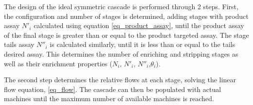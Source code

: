 The design of the ideal symmetric cascade is performed through 2 steps. First,
the configuration and number of stages is determined, adding stages with product assay $N'_i$ calculated using equation \ref{eq_product_assay}, until the
product assay of the final stage is greater than or equal to the product targeted assay. The stage tails assay $N''_i$ is calculated similarly, until it is less than or equal to the tails desired assay.  This determines the number of enriching and stripping stages as well as their enrichment properties ($N_{i}$, $N'_{i}$, $N''_{i}$,$\theta_{i}$).


The second step determines the relative flows at each stage, solving the linear
flow equation, \eqref{eq_flow}.
The cascade can then be populated with actual machines until the maximum number
of available machines is reached.

